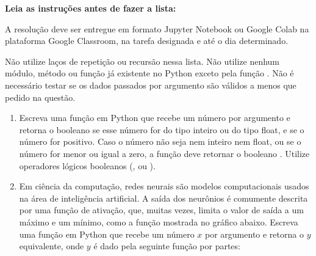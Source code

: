 
\vspace{1cm}

\noindent  \textbf{Leia as instruções antes de fazer a lista:}

\vspace{0.3cm}
\noindent A resolução deve ser entregue em formato Jupyter Notebook ou Google Colab na plataforma Google Classroom, na tarefa designada e até o dia determinado.

\noindent  Não utilize laços de repetição ou recursão nessa lista. Não utilize nenhum módulo, método ou função já existente no Python exceto pela função . Não é necessário testar se os dados passados por argumento são válidos a menos que pedido na questão.


\vspace{0.5cm}


\begin{enumerate}[label=\textbf{Q\arabic*.}]
   \item Escreva uma função em Python que recebe um número por argumento e retorna o booleano  se esse número for do tipo inteiro ou do tipo float, e se o número for positivo. Caso o número não seja nem inteiro nem float, ou se o número for menor ou igual a zero, a função deve retornar o booleano . Utilize operadores lógicos booleanos (,  ou ).

    

    \vspace{0.5cm}

    \item Em ciência da computação, redes neurais são modelos computacionais usados na área de inteligência artificial. A saída dos neurônios é comumente descrita por uma função de ativação, que, muitas vezes, limita o valor de saída a um máximo e um mínimo, como a função mostrada no gráfico abaixo. Escreva uma função em Python que recebe um número $x$ por argumento e retorna o $y$ equivalente, onde $y$ é dado pela seguinte função por partes:

    \begin{center}
\end{center}
\end{enumerate}
